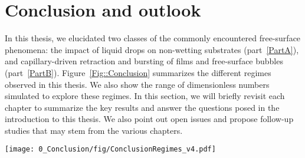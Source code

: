 \chapter*{Conclusion and outlook}\label{chap:Conclusions}

\renewcommand\thefigure{C\arabic{figure}} 
\setcounter{figure}{0}

In this thesis, we elucidated two classes of the commonly encountered free-surface phenomena: the impact of liquid drops on non-wetting substrates (part~\ref{PartA}), and capillary-driven retraction and bursting of films and free-surface bubbles (part~\ref{PartB}). Figure~\ref{Fig::Conclusion} summarizes the different regimes observed in this thesis. We also show the range of dimensionless numbers simulated to explore these regimes. In this section, we will briefly revisit each chapter to summarize the key results and answer the questions posed in the introduction to this thesis. We also point out open issues and propose follow-up studies that may stem from the various chapters.

\begin{sidewaysfigure}
	\centering
	\texttt{[image: 0\_Conclusion/fig/ConclusionRegimes\_v4.pdf]}	
	\caption{Summary of the different regimes and the range of the dimensionless numbers simulated to explore these regimes. The different regime maps contain the Weber number $\Wen$ (equation~\eqref{Ch0::We}, chapters~\ref{chap:DropForces} and~\ref{chap:DropOnDrop}), the Bond number $\Bon$ (equation~\eqref{Ch0::Bo}, chapters~\ref{chap:DropForces} and~\ref{chap:DropViscousBouncing}), dimensionless film thickness $\Gamma$ (equation~\eqref{Ch0::Gamma}, chapter~\ref{chap:DropBouncingOnFilm}), the dimensionless offset $\chi$ (equation~\eqref{Ch0::X}) between the impacting and sessile drops (chapter~\ref{chap:DropOnDrop}), and the plasto-capillary number $\mathcal{J}$ (equation~\eqref{Ch0::J}, chapter~\ref{chap:BurstingBubbleVP}). A common theme among most of these regime maps is the use of Ohnesorge numbers $\Ohn$ (equation~\eqref{Ch0::Oh}) which can be further classified as: the drop Ohnesorge number (chapters~\ref{chap:DropViscousBouncing} and~\ref{chap:DropBouncingOnFilm}), the film Ohnesorge number $\Ohf$ (chapters~\ref{chap:DropBouncingOnFilm} and~\ref{chap:TaylorCulick}), and the surroundings Ohnesorge number $\Ohs$ (chapter~\ref{chap:TaylorCulick}). Please refer to the individual chapters for the details of each regime map.}
	\label{Fig::Conclusion}
\end{sidewaysfigure}

